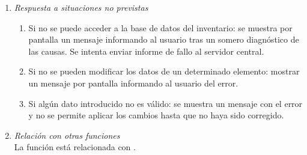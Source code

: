 \begin{enumerate}
\begin{enumerate}
	\end{enumerate}
	\item \textit{Respuesta a situaciones no previstas}
	\begin{enumerate}
		\item Si no se puede acceder a la base de datos del inventario: se muestra por pantalla un mensaje informando al usuario tras un somero diagnóstico de las causas. Se intenta enviar informe de fallo al servidor central.
		\item Si no se pueden modificar los datos de un determinado elemento: mostrar un mensaje por pantalla informando al usuario del error.
		\item Si algún dato introducido no es válido: se muestra un mensaje con el error y no se permite aplicar los cambios hasta que no haya sido corregido.
	\end{enumerate}
	\item \textit{Relación con otras funciones}\\
		La función está relacionada con .

\end{enumerate}
